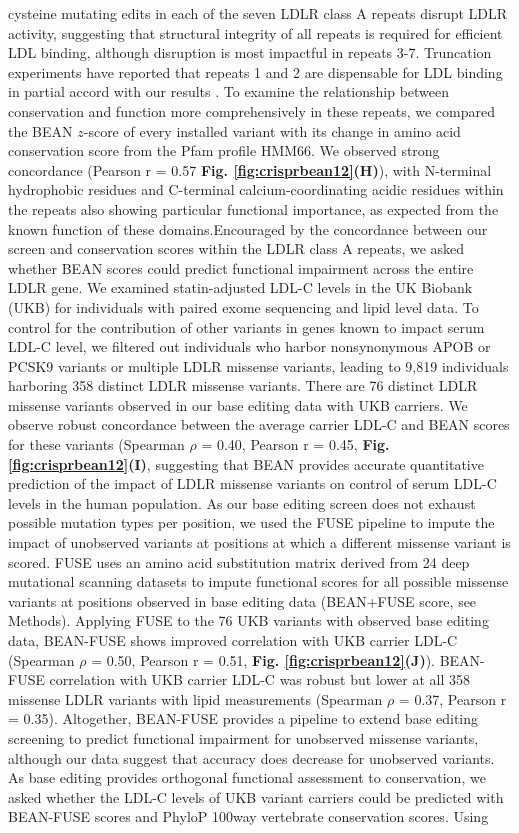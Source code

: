\documentclass[a4paper, titlepage, openright]{book}
\begin{document}
cysteine mutating edits in each of the seven LDLR class A repeats disrupt LDLR activity, suggesting that structural integrity of all repeats is required for efficient LDL binding, although disruption is most impactful in repeats 3-7. Truncation experiments have reported that repeats 1 and 2 are dispensable for LDL binding \citep{russell1989different} in partial accord with our results \citep{jeon2005structure}. To examine the relationship between conservation and function more comprehensively in these repeats, we compared the BEAN $z$-score of every installed variant with its change in amino acid conservation score from the Pfam profile HMM66. We observed strong concordance (Pearson r = 0.57 \textbf{Fig. \ref{fig:crisprbean12}(H)}), with N-terminal hydrophobic residues and C-terminal calcium-coordinating acidic residues within the repeats also showing particular functional importance, as expected from the known function of these domains.Encouraged by the concordance between our screen and conservation scores within the LDLR class A repeats, we asked whether BEAN scores could predict functional impairment across the entire LDLR gene. We examined statin-adjusted LDL-C levels \citep{global2013discovery} in the UK Biobank (UKB) for individuals with paired exome sequencing and lipid level data. To control for the contribution of other variants in genes known to impact serum LDL-C level, we filtered out individuals who harbor nonsynonymous APOB or PCSK9 variants or multiple LDLR missense variants, leading to 9,819 individuals harboring 358 distinct LDLR missense variants. There are 76 distinct LDLR missense variants observed in our base editing data with UKB carriers. We observe robust concordance between the average carrier LDL-C and BEAN scores for these variants (Spearman $\rho$ = 0.40, Pearson r = 0.45, \textbf{Fig. \ref{fig:crisprbean12}(I)}, suggesting that BEAN provides accurate quantitative prediction of the impact of LDLR missense variants on control of serum LDL-C levels in the human population. As our base editing screen does not exhaust possible mutation types per position, we used the FUSE \citep{yu2023joint} pipeline to impute the impact of unobserved variants at positions at which a different missense variant is scored. FUSE uses an amino acid substitution matrix derived from 24 deep mutational scanning datasets to impute functional scores for all possible missense variants at positions observed in base editing data (BEAN+FUSE score, see Methods). Applying FUSE to the 76 UKB variants with observed base editing data, BEAN-FUSE shows improved correlation with UKB carrier LDL-C (Spearman $\rho$ = 0.50, Pearson r = 0.51, \textbf{Fig. \ref{fig:crisprbean12}(J)}). BEAN-FUSE correlation with UKB carrier LDL-C was robust but lower at all 358 missense LDLR variants with lipid measurements (Spearman $\rho$ = 0.37, Pearson r = 0.35). Altogether, BEAN-FUSE provides a pipeline to extend base editing screening to predict functional impairment for unobserved missense variants, although our data suggest that accuracy does decrease for unobserved variants. As base editing provides orthogonal functional assessment to conservation, we asked whether the LDL-C levels of UKB variant carriers could be predicted with BEAN-FUSE scores and PhyloP 100way vertebrate conservation scores. Using 
\end{document}
